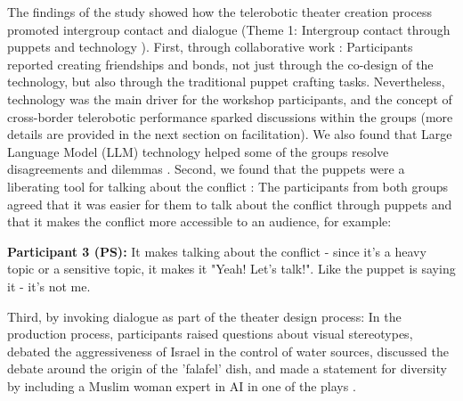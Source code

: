 \documentclass[dissertation,math,vertlayout,pdfa,colorlinks]{aaltoseries}
\begin{document}
The findings of the study showed how the telerobotic theater creation process promoted intergroup contact and dialogue (Theme 1: Intergroup contact through puppets and technology \cite[p. 14]{peledTeleroboticTheaterOppressed2025}). First, through collaborative work \cite[p. 14]{peledTeleroboticTheaterOppressed2025}: Participants reported creating friendships and bonds, not just through the co-design of the technology, but also through the traditional puppet crafting tasks. Nevertheless, technology was the main driver for the workshop participants, and the concept of cross-border telerobotic performance sparked discussions within the groups (more details are provided in the next section on facilitation). We also found that Large Language Model (LLM) technology helped some of the groups resolve disagreements and dilemmas \cite[p. 22]{peledTeleroboticTheaterOppressed2025}. Second, we found that the puppets were a liberating tool for talking about the conflict \cite[p. 13]{peledTeleroboticTheaterOppressed2025}: The participants from both groups agreed that it was easier for them to talk about the conflict through puppets and that it makes the conflict more accessible to an audience, for example:
\begin{displayquote}
    \textbf{Participant 3 (PS):} It makes talking about the conflict - since it's a heavy topic or a sensitive topic, it makes it "Yeah! Let's talk!". Like the puppet is saying it -  it's not me.
\end{displayquote}
Third, by invoking dialogue as part of the theater design process: In the production process, participants raised questions about visual stereotypes, debated the aggressiveness of Israel in the control of water sources, discussed the debate around the origin of the 'falafel' dish, and made a statement for diversity by including a Muslim woman expert in AI in one of the plays \cite[p. 14]{peledTeleroboticTheaterOppressed2025}.
\end{document}
